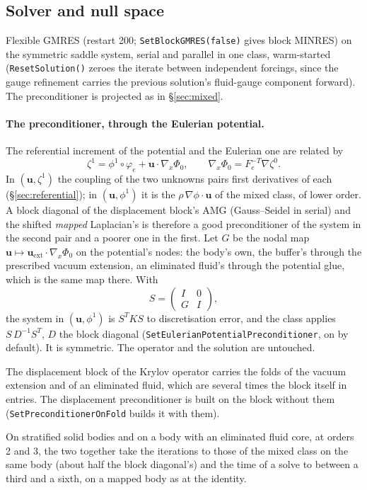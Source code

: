 \documentclass[11pt]{article}
\numberwithin{equation}{section}
\theoremstyle{remark}
\newcommand{\vu}{\mathbf{u}}
\newcommand{\code}[1]{\texttt{#1}}
\begin{document}
\subsection{Solver and null space}

Flexible GMRES (restart 200; \code{SetBlockGMRES(false)} gives block
MINRES) on the symmetric saddle system, serial and parallel in one class,
warm-started (\code{ResetSolution()} zeroes the iterate between
independent forcings, since the gauge refinement carries the previous
solution's fluid-gauge component forward). The preconditioner is projected
as in \S\ref{sec:mixed}.

\paragraph{The preconditioner, through the Eulerian potential.}
The referential increment of the potential and the Eulerian one are
related by
\[
  \zeta^1 = \phi^1\circ\varphi_e + \vu\cdot\nabla_x\Phi_0,
  \qquad \nabla_x\Phi_0 = F_e^{-T}\nabla\zeta^0 .
\]
In $(\vu,\zeta^1)$ the coupling of the two unknowns pairs first derivatives
of each (\S\ref{sec:referential}); in $(\vu,\phi^1)$ it is the
$\rho\,\nabla\phi\cdot\vu$ of the mixed class, of lower order. A block
diagonal of the displacement block's AMG (Gauss--Seidel in serial) and the
shifted \emph{mapped} Laplacian's is therefore a good preconditioner of the
system in the second pair and a poorer one in the first. Let $G$ be the
nodal map $\vu\mapsto\vu_{\mathrm{ext}}\cdot\nabla_x\Phi_0$ on the
potential's nodes: the body's own, the buffer's through the prescribed
vacuum extension, an eliminated fluid's through the potential glue, which
is the same map there. With
\[
  S = \begin{pmatrix} I & 0\\ G & I\end{pmatrix},
\]
the system in $(\vu,\phi^1)$ is $S^TKS$ to discretisation error, and the
class applies $S\,D^{-1}S^T$, $D$ the block diagonal
(\code{SetEulerianPotentialPreconditioner}, on by default). It is
symmetric. The operator and the solution are untouched.

The displacement block of the Krylov operator carries the folds of the
vacuum extension and of an eliminated fluid, which are several times the
block itself in entries. The displacement preconditioner is built on the
block without them (\code{SetPreconditionerOnFold} builds it with them).

On stratified solid bodies and on a body with an eliminated fluid core,
at orders 2 and 3, the two together take the iterations to those of the
mixed class on the same body (about half the block diagonal's) and the
time of a solve to between a third and a sixth, on a mapped body as at
the identity.
\end{document}
